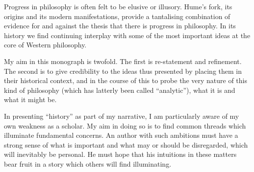 Progress in philosophy is often felt to be elusive or illusory.
Hume's fork, its origins and its modern manifestations, provide a tantalising combination of evidence for and against the thesis that there is progress in philosophy.
In its history we find continuing interplay with some of the most important ideas at the core of Western philosophy.

My aim in this monograph is twofold.
The first is re-statement and refinement.
The second is to give credibility to the ideas thus presented by placing them in their historical context, and in the course of this to probe the very nature of this kind of philosophy (which has latterly been called ``analytic''), what it is and what it might be.

In presenting ``history'' as part of my narrative, I am particularly aware of my own weakness as a scholar.
My aim in doing so is to find common threads which illuminate fundamental concerns.
An author with such ambitions must have a strong sense of what is important and what may or should be disregarded, which will inevitably be personal.
He must hope that his intuitions in these matters bear fruit in a story which others will find illuminating.
